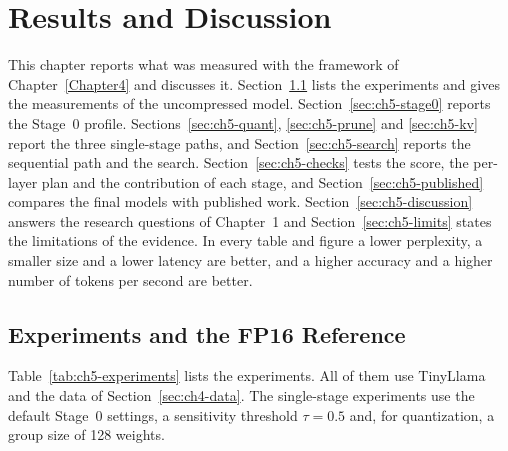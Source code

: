 \documentclass[
11pt, %
english, %
singlespacing, %
headsepline, %
]{MastersDoctoralThesis} %
\begin{document}
\chapter{Results and Discussion}
\label{Chapter5}

This chapter reports what was measured with the framework of Chapter~\ref{Chapter4} and discusses it. Section~\ref{sec:ch5-experiments} lists the experiments and gives the measurements of the uncompressed model. Section~\ref{sec:ch5-stage0} reports the Stage~0 profile. Sections~\ref{sec:ch5-quant}, \ref{sec:ch5-prune} and \ref{sec:ch5-kv} report the three single-stage paths, and Section~\ref{sec:ch5-search} reports the sequential path and the search. Section~\ref{sec:ch5-checks} tests the score, the per-layer plan and the contribution of each stage, and Section~\ref{sec:ch5-published} compares the final models with published work. Section~\ref{sec:ch5-discussion} answers the research questions of Chapter~1 and Section~\ref{sec:ch5-limits} states the limitations of the evidence. In every table and figure a lower perplexity, a smaller size and a lower latency are better, and a higher accuracy and a higher number of tokens per second are better.

\section{Experiments and the FP16 Reference}
\label{sec:ch5-experiments}

Table~\ref{tab:ch5-experiments} lists the experiments. All of them use TinyLlama and the data of Section~\ref{sec:ch4-data}. The single-stage experiments use the default Stage~0 settings, a sensitivity threshold $\tau = 0.5$ and, for quantization, a group size of 128 weights.
\end{document}
